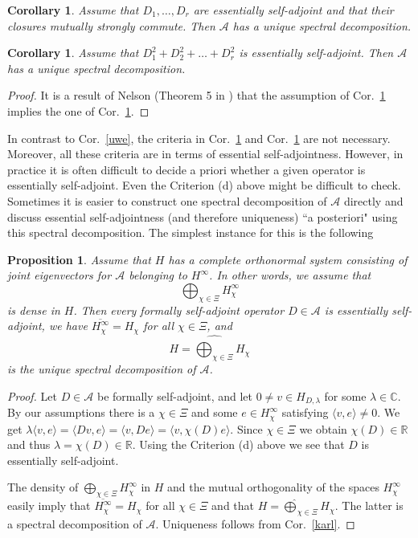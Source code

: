 \documentclass[10]{amsart}
\newtheorem{cor}[thm]{Corollary}
\newtheorem{pro}[thm]{Proposition}
\theoremstyle{remark}
\theoremstyle{definition}
\numberwithin{equation}{section}
\newcommand{\R}{\mathbb{R}}           %
\newcommand{\C}{\mathbb{C}}           %
\newcommand{\Cal}{\mathcal}
\begin{document}
{\begin{cor}\label{klaus} Assume that $D_1,\dots,D_r$ are essentially self-adjoint and that their closures mutually strongly commute. Then $\Cal A$ has a unique spectral decomposition.
\end{cor}

\begin{cor}\label{heinz}
 Assume that $D_1^2+D_2^2+\dots+D_r^2$ is essentially self-adjoint. Then $\Cal A$ has a unique spectral decomposition.
\end{cor}
\begin{proof} It is a result of Nelson (Theorem 5 in \cite{Nel59}) that the assumption of Cor.~\ref{heinz} implies the one of Cor.~\ref{klaus}.
\end{proof}
In contrast to Cor.~\ref{uwe}, the criteria in Cor.~\ref{klaus} and Cor.~\ref{heinz} are not necessary. Moreover, all these criteria are in terms of essential self-adjointness.
However, in practice it is often difficult to decide a priori whether a given operator is essentially self-adjoint. Even the Criterion (d) above might be difficult
to check. Sometimes it is easier to construct one spectral decomposition of $\Cal A$ directly and discuss essential self-adjointness (and therefore uniqueness) ``a  posteriori" using this
spectral decomposition. The simplest instance for this is the following

\begin{pro}\label{schwoch} Assume that $H$ has a complete orthonormal system consisting of joint eigenvectors for $\Cal A$ belonging to $H^\infty$.
In other words, we assume that
$$ \bigoplus_{\chi\in\Xi} H_\chi^\infty $$
is dense in $H$. Then every formally self-adjoint operator $D\in \Cal A$ is essentially self-adjoint, we have  $\overline{H_\chi^\infty}= H_\chi$  for all $\chi\in\Xi$,
and 
$$  H=\widehat{\bigoplus_{\chi\in\Xi}} H_\chi$$
is the unique spectral decomposition of $\Cal{A}$.
\end{pro}
\begin{proof} Let $D\in\Cal A$ be formally self-adjoint, and let $0\ne v\in H_{D,\lambda}$ for some $\lambda\in \C$. By our assumptions there is a $\chi\in\Xi$ and some
$e\in  H_\chi^\infty$ satisfying $\langle v,e\rangle\ne 0$.
We get $\lambda \langle v,e\rangle=\langle Dv,e\rangle=\langle v,De\rangle=\langle v,\chi(D)e\rangle$. Since $\chi\in\Xi$ we obtain $\chi(D)\in\R$ and thus
$\lambda=\chi(D)\in\R$. Using the Criterion (d) above we see that $D$ is essentially self-adjoint.

The density of $\bigoplus_{\chi\in\Xi} H_\chi^\infty$ in $H$ and the mutual orthogonality of the spaces  $H_\chi^\infty$ easily imply that  $\overline{H_\chi^\infty}= H_\chi$ 
for all $\chi\in\Xi$ and that $H=\widehat{\bigoplus}_{\chi\in\Xi} H_\chi$. The latter is a spectral decomposition of $\Cal A$. Uniqueness follows from Cor.~\ref{karl}.
\end{proof}

}
\end{document}
